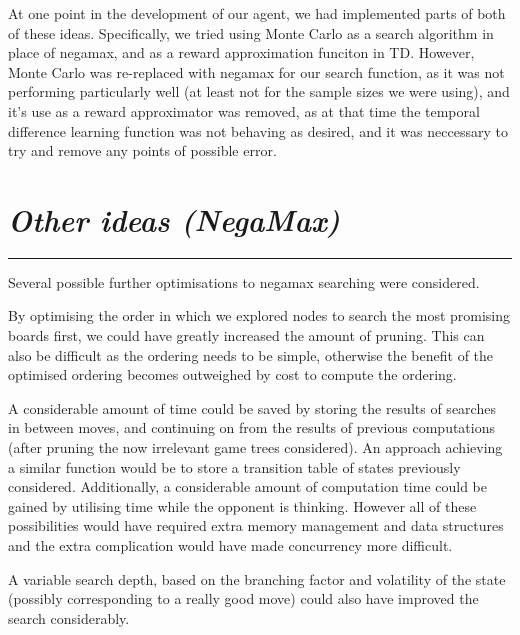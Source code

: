 \documentclass[10pt]{report}
\begin{document}
\begin{multicols}{2}
At one point in the development of our agent, we had implemented parts of both of these ideas. Specifically, we tried using Monte Carlo as a search algorithm in place of negamax, and as a reward approximation funciton in TD. However, Monte Carlo was re-replaced with negamax for our search function, as it was not performing particularly well (at least not for the sample sizes we were using), and it's use as a reward approximator was removed, as at that time the temporal difference learning function was not behaving as desired, and it was neccessary to try and remove any points of possible error.

\section*{\emph{Other ideas (NegaMax)}}
\hrule

Several possible further optimisations to negamax searching were considered.

By optimising the order in which we explored nodes to search the most promising boards first, we could have greatly increased the amount of pruning. This can also be difficult as the ordering needs to be simple, otherwise the benefit of the optimised ordering becomes outweighed by cost to compute the ordering.

A considerable amount of time could be saved by storing the results of searches in between moves, and continuing on from the results of previous computations (after pruning the now irrelevant game trees considered). An approach achieving a similar function would be to store a transition table of states previously considered. Additionally, a considerable amount of computation time could be gained by utilising time while the opponent is thinking. However all of these possibilities would have required extra memory management and data structures and the extra complication would have made concurrency more difficult.

A variable search depth, based on the branching factor and volatility of the state (possibly corresponding to a really good move) could also have improved the search considerably.

\end{multicols}
\end{document}
